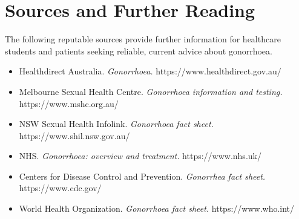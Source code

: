 \section*{Sources and Further Reading}
The following reputable sources provide further information for healthcare students and patients seeking reliable, current advice about gonorrhoea.

\begin{itemize}
    \item Healthdirect Australia. \textit{Gonorrhoea.} https://www.healthdirect.gov.au/
    \item Melbourne Sexual Health Centre. \textit{Gonorrhoea information and testing.} https://www.mshc.org.au/
    \item NSW Sexual Health Infolink. \textit{Gonorrhoea fact sheet.} https://www.shil.nsw.gov.au/
    \item NHS. \textit{Gonorrhoea: overview and treatment.} https://www.nhs.uk/
    \item Centers for Disease Control and Prevention. \textit{Gonorrhea fact sheet.} https://www.cdc.gov/
    \item World Health Organization. \textit{Gonorrhoea fact sheet.} https://www.who.int/
\end{itemize}
